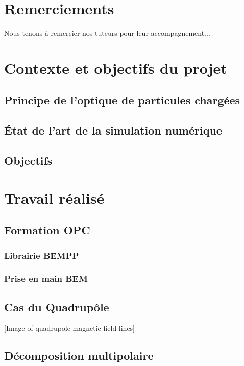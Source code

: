 \documentclass[12pt,a4paper]{report} %
\begin{document}
\chapter*{Remerciements}
Nous tenons à remercier nos tuteurs pour leur accompagnement...

\tableofcontents
\newpage


\chapter{Contexte et objectifs du projet}
\section{Principe de l’optique de particules chargées}
\section{État de l’art de la simulation numérique}
\section{Objectifs}

\chapter{Travail réalisé}
\section{Formation OPC}
\subsection{Librairie BEMPP}
\subsection{Prise en main BEM}

\section{Cas du Quadrupôle}


[Image of quadrupole magnetic field lines]


\section{Décomposition multipolaire}
\end{document}
